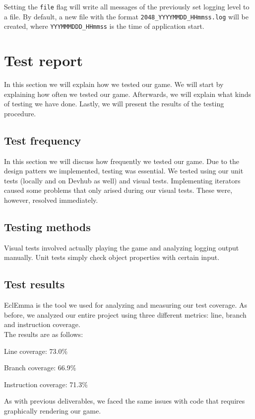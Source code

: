 \documentclass[a4paper,11pt,report]{scrartcl}
\begin{document}
Setting the \texttt{file} flag will write all messages of the previously set
logging level to a file. By default, a new file with the format
\texttt{2048\_YYYYMMDD\_HHmmss.log} will be created, where
\texttt{YYYMMMDDD\_HHmmss} is the time of application start.

\newpage\section{Test report}

In this section we will explain how we tested our game. We will start by
explaining how often we tested our game. Afterwards, we will explain what
kinds of testing we have done. Lastly, we will present the results of the
testing procedure.

\subsection{Test frequency}
In this section we will discuss how frequently we tested our game. Due to the
design patters we implemented, testing was essential. We tested using our
unit tests (locally and on Devhub as well) and visual tests. Implementing
iterators caused some problems that only arised during our visual tests. These
were, however, resolved immediately.

\subsection{Testing methods}
Visual tests involved actually playing the game and analyzing logging output
manually. Unit tests simply check object properties with certain input.

\subsection{Test results}
EclEmma is the tool we used for analyzing and measuring our test coverage.
As before, we analyzed our entire project using three different metrics: line,
branch and instruction coverage.\\

The results are as follows:
\begin{description}
	\item Line coverage: 73.0\%
	\item Branch coverage: 66.9\%
	\item Instruction coverage: 71.3\%
\end{description}
As with previous deliverables, we faced the same issues with code that requires
graphically rendering our game. 
\end{document}
